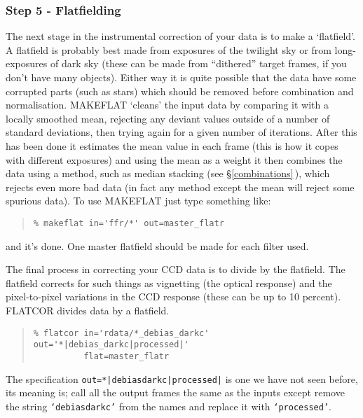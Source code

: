 \documentclass[twoside,11pt]{article}
\newcommand{\hyperref}[4]{#2\ref{#4}#3}
\newcommand{\htmlref}[2]{#1}
\newcommand{\latexhtml}[2]{#1}
\newcommand{\xlabel}[1]{}
\renewcommand{\_}{\texttt{\symbol{95}}}
\newcommand{\ttsize}{\latexhtml{\small}{}}
\newenvironment{myquote}{\begin{quote}\ttsize}{\end{quote}}
\newcommand{\text}[1]{{\ttsize \tt #1}}
\newcommand{\routine}[1]{{\sc #1}}
\newcommand{\xroutine}[1]{\htmlref{{\sc #1}}{#1}}
\begin{document}
\subsubsection{\xlabel{flatfielding}\label{flatfielding}Step 5 - Flatfielding}

The next stage in the instrumental correction of your data is to make
a `flatfield'. A flatfield is probably best made from exposures of the
twilight sky or from long-exposures of dark sky (these can be made
from ``dithered'' target frames, if you don't have many
objects).
Either way it is quite possible that the data have some corrupted
parts (such as stars) which should be removed before combination and
normalisation.
\xroutine{MAKEFLAT} `cleans' the input data by comparing it with a locally
smoothed mean, rejecting any deviant values outside of a number of
standard deviations, then trying again for a given number of
iterations.
After this has been done it estimates the mean value in each frame
(this is how it copes with different exposures) and using the mean as
a weight it then combines the data using a method,
such as median stacking (see
\hyperref{elsewhere}{\S}{\,}{combinations}), which rejects even more bad
data (in fact any method except the mean will reject some spurious
data).
To use \routine{MAKEFLAT} just type something like:
\begin{myquote}
\begin{verbatim}
% makeflat in='ffr/*' out=master_flatr
\end{verbatim}
\end{myquote}
and it's done.
One master flatfield should be made for each filter used.

The final process in correcting your CCD data is to divide by the
flatfield. The flatfield corrects for such things as
vignetting (the optical response) and the pixel-to-pixel variations in
the CCD response (these can be up to 10 percent).
\xroutine{FLATCOR} divides data by a flatfield.
\begin{myquote}
\begin{verbatim}
% flatcor in='rdata/*_debias_darkc' out='*|debias_darkc|processed|'
          flat=master_flatr
\end{verbatim}
\end{myquote}
The specification \text{out=*|debias\_darkc|processed|} is one we
have not seen before, its meaning is; call all the output frames the
same as the inputs except remove the string \text{`debias\_darkc'}
from the names and replace it with \text{`processed'}.
\end{document}
